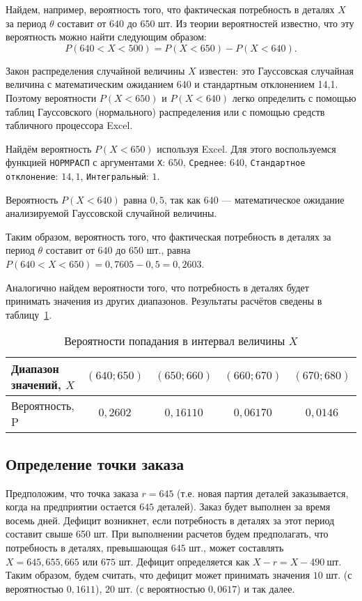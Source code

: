 Найдем, например, вероятность того, что фактическая потребность в деталях $X$
за период $\theta$ составит от $640$ до $650$ шт.
Из теории вероятностей известно, что эту вероятность можно найти следующим образом:
\[
	P(640<X<500) = P(X<650) - P(X<640).
\]

Закон распределения случайной величины $X$ известен:
это Гауссовская случайная величина с математическим ожиданием 640 и стандартным отклонением 14,1.
Поэтому вероятности $P(X<650)$ и $P(X<640)$ легко определить с помощью таблиц
Гауссовского (нормального) распределения или с помощью средств табличного процессора Excel.

Найдём вероятность $P(X<650)$ используя Excel. Для этого воспользуемся функцией
\texttt{НОРМРАСП} с аргументами \texttt{X}: $650$, \texttt{Среднее}: $640$,
\texttt{Стандартное отклонение}: $14{,}1$, \texttt{Интегральный}: $1$.

Вероятность $P(X<640)$ равна $0{,}5$, так как $640$ --- математическое ожидание
анализируемой Гауссовской случайной величины. 

Таким образом, вероятность того, что фактическая потребность в деталях за
период $\theta$ составит от $640$ до $650$ шт.,
равна $P(640<X<650) = 0{,}7605 - 0{,}5 = 0{,}2603$.

Аналогично найдем вероятности того, что потребность в деталях
будет принимать значения из других диапазонов. Результаты расчётов
сведены в таблицу~\ref{tbl:p}.

\begin{table} [h!]
  \caption{Вероятности попадания в интервал величины $X$}
  \label{tbl:p}
  \begin{tabular}{| m{6cm} | c | c | c | c |}
    \hline

    Диапазон значений, $X$ & $(640;650)$ & $(650;660)$ & $(660;670)$ & $(670;680)$ \\ \hline

   	Вероятность, P & $0{,}2602$ & $0{,}16110$ & $0{,}06170$ & $0{,}0146$ \\ \hline
      
  \end{tabular}
\end{table}



\subsection{Определение точки заказа}

Предположим, что точка заказа $r=645$ (т.е. новая партия деталей заказывается,
когда на предприятии остается $645$ деталей). Заказ будет выполнен за время
восемь дней. Дефицит возникнет, если потребность в деталях за этот период
составит свыше 650 шт. При выполнении расчетов будем предполагать,
что потребность в деталях, превышающая $645$ \: шт., может составлять $X=645, 655, 665 \text{ или } 675$ шт.
Дефицит определяется как $X-r = X-490 \:\text{шт.} $ Таким образом, будем считать,
что дефицит может принимать значения $10$ шт. (с вероятностью $0{,}1611$),
$20$ шт. (с вероятностью $0{,}0617$) и так далее.

